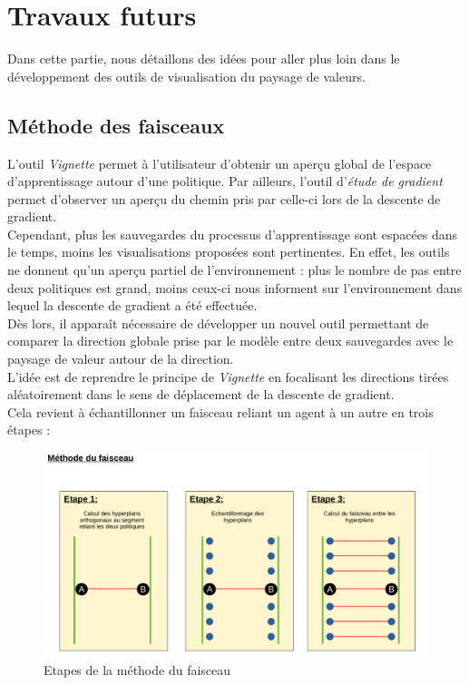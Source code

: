 \documentclass[12pt]{article}
\begin{document}
\section{Travaux futurs}
\label{future}

Dans cette partie, nous détaillons des idées pour aller plus loin dans le développement des outils de visualisation du paysage de valeurs. \\

\subsection{Méthode des faisceaux}

L'outil \emph{Vignette} permet à l'utilisateur d'obtenir un aperçu global de l'espace d'apprentissage autour d'une politique. Par ailleurs, l'outil d'\emph{étude de gradient} permet d'observer un aperçu du chemin pris par celle-ci lors de la descente de gradient. \\

Cependant, plus les sauvegardes du processus d'apprentissage sont espacées dans le temps, moins les visualisations proposées sont pertinentes. En effet, les outils ne donnent qu'un aperçu partiel de l'environnement : plus le nombre de pas entre deux politiques est grand, moins ceux-ci nous informent sur l'environnement dans lequel la descente de gradient a été effectuée. \\

Dès lors, il apparaît nécessaire de développer un nouvel outil permettant de comparer la direction globale prise par le modèle entre deux sauvegardes avec le paysage de valeur autour de la direction. \\

L'idée est de reprendre le principe de \emph{Vignette} en focalisant les directions tirées aléatoirement dans le sens de déplacement de la descente de gradient. \\

Cela revient à échantillonner un faisceau reliant un agent à un autre en trois étapes : \\

\begin{figure}[htp]
    \centering
    \includegraphics[width=18cm]{Images/faisceaux}
    \caption{Etapes de la méthode du faisceau}
    \label{fig:faisceaux}
\end{figure}
\end{document}
